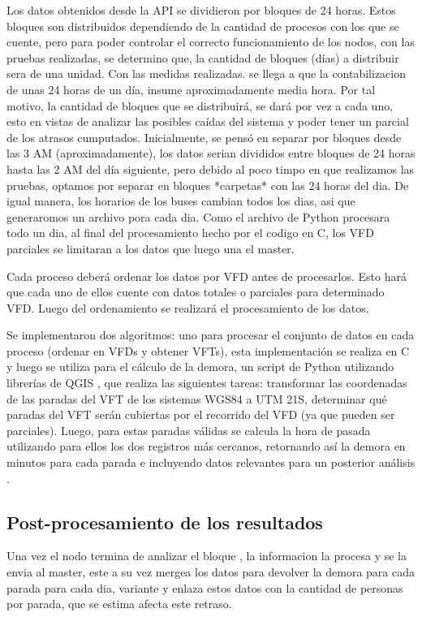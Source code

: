 \documentclass[journal]{IEEEtran}
\begin{document}
Los datos obtenidos desde la API se dividieron por bloques de 24 horas. Estos bloques son distribuidos dependiendo de la cantidad de procesos con los que se cuente, pero para poder controlar el correcto funcionamiento de los nodos, con las pruebas realizadas, se determino que, la cantidad de bloques (días) a distribuir sera de una unidad. Con las medidas realizadas. se llega a que la contabilizacion de unas 24 horas de un día, insume aproximadamente media hora. Por tal motivo, la cantidad de bloques que se distribuirá, se dará por vez a cada uno, esto en vistas de analizar las posibles caídas del sistema y poder tener un parcial de los atrasos cumputados.
Inicialmente, se pensó en separar por bloques desde las 3 AM (aproximadamente), los datos serian divididos entre bloques de 24 horas hasta las 2 AM del día siguiente, pero debido al poco timpo en que realizamos las pruebas, optamos por separar en bloques *carpetas* con las 24 horas del dia. De igual manera, los horarios de los buses cambian todos los dias, asi que generaromos un archivo pora cada dia. Como el archivo de Python procesara todo un dia, al final del procesamiento hecho por el codigo en C, los VFD parciales se limitaran a los datos que luego una el master.

Cada proceso deberá ordenar los datos por VFD antes de procesarlos. Esto hará que cada uno de ellos cuente con datos totales o parciales para determinado VFD. Luego del ordenamiento se realizará el procesamiento de los datos.

Se implementaron dos algoritmos: uno para procesar el
conjunto de datos en cada proceso (ordenar en VFDs y obtener VFTs), esta implementación se realiza en C y luego se utiliza para el cálculo de la demora, un script de Python utilizando librerías de QGIS \cite{qgis}, que realiza las siguientes tareas: transformar las coordenadas de las paradas del VFT de los sistemas WGS84 a UTM 21S, determinar qué paradas del VFT serán cubiertas por el recorrido del VFD (ya que pueden ser parciales). Luego, para estas paradas válidas se calcula la hora de pasada utilizando para ellos los dos registros más cercanos, retornando así la demora en minutos para cada parada e incluyendo datos relevantes para un posterior análisis . 

\subsection{Post-procesamiento de los resultados}
Una vez el nodo termina de analizar el bloque , la informacion la procesa y se la envia al master, este a su vez mergea los datos para devolver la demora para cada parada para cada dia, variante y enlaza estos datos con la cantidad de personas por parada, que se estima afecta este retraso.
\end{document}

